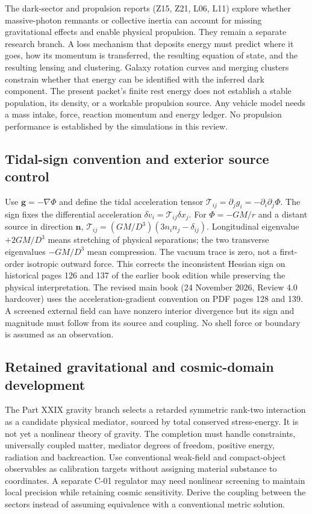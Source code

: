 \documentclass[
  11pt,
  twoside]{article}
\begin{document}
The dark-sector and propulsion reports (Z15, Z21, L06, L11) explore
whether massive-photon remnants or collective inertia can account for
missing gravitational effects and enable physical propulsion. They
remain a separate research branch. A loss mechanism that deposits energy
must predict where it goes, how its momentum is transferred, the
resulting equation of state, and the resulting lensing and clustering.
Galaxy rotation curves and merging clusters constrain whether that
energy can be identified with the inferred dark component. The present
packet's finite rest energy does not establish a stable population, its
density, or a workable propulsion source. Any vehicle model needs a mass
intake, force, reaction momentum and energy ledger. No propulsion
performance is established by the simulations in this review.

\subsection{Tidal-sign convention and exterior source
control}\label{tidal-sign-convention-and-exterior-source-control}

Use \(\mathbf g=-\nabla\Phi\) and define the tidal acceleration tensor
\(\mathcal T_{ij}=\partial_j g_i=-\partial_i\partial_j\Phi\). The sign
fixes the differential acceleration
\(\delta\dot v_i=\mathcal T_{ij}\delta x_j\). For \(\Phi=-GM/r\) and a
distant source in direction \(\mathbf n\),
\(\mathcal T_{ij}=(GM/D^3)(3n_in_j-\delta_{ij})\). Longitudinal
eigenvalue \(+2GM/D^3\) means stretching of physical separations; the
two transverse eigenvalues \(-GM/D^3\) mean compression. The vacuum
trace is zero, not a first-order isotropic outward force. This corrects
the inconsistent Hessian sign on historical pages 126 and 137 of the
earlier book edition while preserving the physical interpretation. The
revised main book (24 November 2026, Review 4.0 hardcover) uses the
acceleration-gradient convention on PDF pages 128 and 139. A screened
external field can have nonzero interior divergence but its sign and
magnitude must follow from its source and coupling. No shell force or
boundary is assumed as an observation.

\subsection{Retained gravitational and cosmic-domain
development}\label{retained-gravitational-and-cosmic-domain-development}

The Part XXIX gravity branch selects a retarded symmetric rank-two
interaction as a candidate physical mediator, sourced by total conserved
stress-energy. It is not yet a nonlinear theory of gravity. The
completion must handle constraints, universally coupled matter, mediator
degrees of freedom, positive energy, radiation and backreaction. Use
conventional weak-field and compact-object observables as calibration
targets without assigning material substance to coordinates. A separate
C-01 regulator may need nonlinear screening to maintain local precision
while retaining cosmic sensitivity. Derive the coupling between the
sectors instead of assuming equivalence with a conventional metric
solution.
\end{document}
